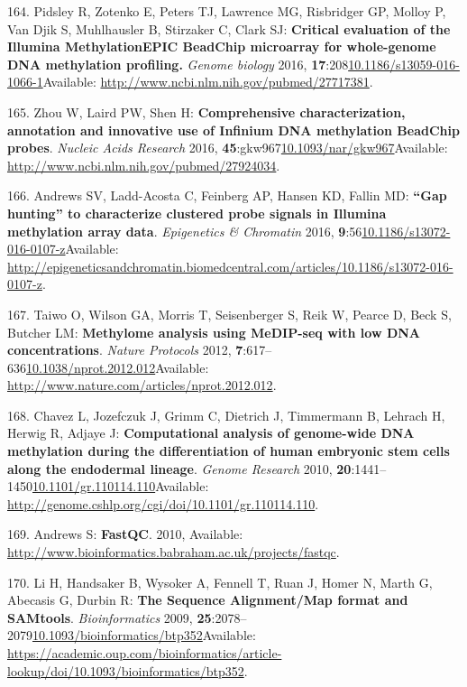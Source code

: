 \documentclass[
]{book}
\begin{document}
\leavevmode\hypertarget{ref-Pidsley2016}{}%
164. Pidsley R, Zotenko E, Peters TJ, Lawrence MG, Risbridger GP, Molloy P, Van Djik S, Muhlhausler B, Stirzaker C, Clark SJ: \textbf{Critical evaluation of the Illumina MethylationEPIC BeadChip microarray for whole-genome DNA methylation profiling.} \emph{Genome biology} 2016, \textbf{17}:208\href{https://doi.org/10.1186/s13059-016-1066-1}{10.1186/s13059-016-1066-1}Available: \url{http://www.ncbi.nlm.nih.gov/pubmed/27717381}.

\leavevmode\hypertarget{ref-Zhou2017}{}%
165. Zhou W, Laird PW, Shen H: \textbf{Comprehensive characterization, annotation and innovative use of Infinium DNA methylation BeadChip probes}. \emph{Nucleic Acids Research} 2016, \textbf{45}:gkw967\href{https://doi.org/10.1093/nar/gkw967}{10.1093/nar/gkw967}Available: \url{http://www.ncbi.nlm.nih.gov/pubmed/27924034}.

\leavevmode\hypertarget{ref-Andrews2016}{}%
166. Andrews SV, Ladd-Acosta C, Feinberg AP, Hansen KD, Fallin MD: \textbf{``Gap hunting'' to characterize clustered probe signals in Illumina methylation array data}. \emph{Epigenetics \& Chromatin} 2016, \textbf{9}:56\href{https://doi.org/10.1186/s13072-016-0107-z}{10.1186/s13072-016-0107-z}Available: \url{http://epigeneticsandchromatin.biomedcentral.com/articles/10.1186/s13072-016-0107-z}.

\leavevmode\hypertarget{ref-Taiwo2012}{}%
167. Taiwo O, Wilson GA, Morris T, Seisenberger S, Reik W, Pearce D, Beck S, Butcher LM: \textbf{Methylome analysis using MeDIP-seq with low DNA concentrations}. \emph{Nature Protocols} 2012, \textbf{7}:617--636\href{https://doi.org/10.1038/nprot.2012.012}{10.1038/nprot.2012.012}Available: \url{http://www.nature.com/articles/nprot.2012.012}.

\leavevmode\hypertarget{ref-Chavez2010}{}%
168. Chavez L, Jozefczuk J, Grimm C, Dietrich J, Timmermann B, Lehrach H, Herwig R, Adjaye J: \textbf{Computational analysis of genome-wide DNA methylation during the differentiation of human embryonic stem cells along the endodermal lineage}. \emph{Genome Research} 2010, \textbf{20}:1441--1450\href{https://doi.org/10.1101/gr.110114.110}{10.1101/gr.110114.110}Available: \url{http://genome.cshlp.org/cgi/doi/10.1101/gr.110114.110}.

\leavevmode\hypertarget{ref-Andrews2010}{}%
169. Andrews S: \textbf{FastQC}. 2010, Available: \url{http://www.bioinformatics.babraham.ac.uk/projects/fastqc}.

\leavevmode\hypertarget{ref-Li2009b}{}%
170. Li H, Handsaker B, Wysoker A, Fennell T, Ruan J, Homer N, Marth G, Abecasis G, Durbin R: \textbf{The Sequence Alignment/Map format and SAMtools}. \emph{Bioinformatics} 2009, \textbf{25}:2078--2079\href{https://doi.org/10.1093/bioinformatics/btp352}{10.1093/bioinformatics/btp352}Available: \url{https://academic.oup.com/bioinformatics/article-lookup/doi/10.1093/bioinformatics/btp352}.
\end{document}
